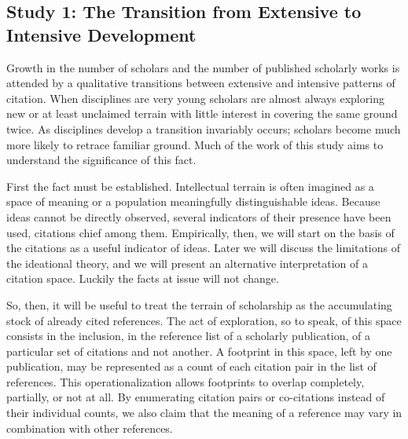 \subsection{Study 1: The Transition from Extensive to Intensive
Development}\label{study-1-the-transition-from-extensive-to-intensive-development}

Growth in the number of scholars and the number of published scholarly
works is attended by a qualitative transitions between extensive and
intensive patterns of citation. When disciplines are very young scholars
are almost always exploring new or at least unclaimed terrain with
little interest in covering the same ground twice. As disciplines
develop a transition invariably occurs; scholars become much more likely
to retrace familiar ground. Much of the work of this study aims to
understand the significance of this fact.

First the fact must be established. Intellectual terrain is often
imagined as a space of meaning or a population meaningfully
distinguishable ideas. Because ideas cannot be directly observed,
several indicators of their presence have been used, citations chief
among them. Empirically, then, we will start on the basis of the
citations as a useful indicator of ideas. Later we will discuss the
limitations of the ideational theory, and we will present an alternative
interpretation of a citation space. Luckily the facts at issue will not
change.

So, then, it will be useful to treat the terrain of scholarship as the
accumulating stock of already cited references. The act of exploration,
so to speak, of this space consists in the inclusion, in the reference
list of a scholarly publication, of a particular set of citations and
not another. A footprint in this space, left by one publication, may be
represented as a count of each citation pair in the list of references.
This operationalization allows footprints to overlap completely,
partially, or not at all. By enumerating citation pairs or co-citations
instead of their individual counts, we also claim that the meaning of a
reference may vary in combination with other references.

